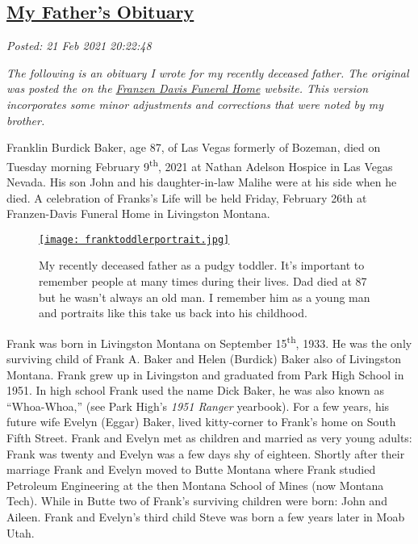 %

\subsection*{\href{http://analyzethedatanotthedrivel.org/2021/02/21/my-fathers-obituary/}{My Father's Obituary}}


\noindent\emph{Posted: 21 Feb 2021 20:22:48}
\vspace{6pt}

\emph{The following is an obituary I wrote for my recently deceased
father. The original was posted the on the
\href{https://www.franzen-davis.com/obituaries/Franklin-Burdick-Baker?obId=19950108}{Franzen
Davis Funeral Home} website. This version incorporates some minor
adjustments and corrections that were noted by my brother.}

\medskip

Franklin Burdick Baker, age 87, of Las Vegas formerly of Bozeman, died
on Tuesday morning February 9\textsuperscript{th}, 2021 at Nathan
Adelson Hospice in Las Vegas Nevada. His son John and his
daughter-in-law Malihe were at his side when he died. A celebration of
Franks's Life will be held Friday, February 26th at Franzen-Davis
Funeral Home in Livingston Montana.

\captionsetup[figure]{labelformat=empty}
\begin{SCfigure}[50]
\centering
\href{https://conceptcontrol.smugmug.com/People/The-Way-We-Were/i-KZxPpwz/A}{\texttt{[image: franktoddlerportrait.jpg]}}
\caption[My recently deceased father as a pudgy toddler.]{My recently deceased father as a pudgy toddler. It's important
to remember people at many times during their lives. Dad died at 87 but
he wasn't always an old man. I remember him as a young man and portraits
like this take us back into his childhood.}
\label{fig:7074x0}
\end{SCfigure}

Frank was born in Livingston Montana on September
15\textsuperscript{th}, 1933. He was the only surviving child of Frank
A. Baker and Helen (Burdick) Baker also of Livingston Montana. Frank
grew up in Livingston and graduated from Park High School in 1951. In
high school Frank used the name Dick Baker, he was also known as
``Whoa-Whoa,'' (see Park High's \emph{1951 Ranger} yearbook). For a few
years, his future wife Evelyn (Eggar) Baker, lived kitty-corner to
Frank's home on South Fifth Street. Frank and Evelyn met as children and
married as very young adults: Frank was twenty and Evelyn was a few days
shy of eighteen. Shortly after their marriage Frank and Evelyn moved to
Butte Montana where Frank studied Petroleum Engineering at the then
Montana School of Mines (now Montana Tech). While in Butte two of
Frank's surviving children were born: John and Aileen. Frank and
Evelyn's third child Steve was born a few years later in Moab Utah.

